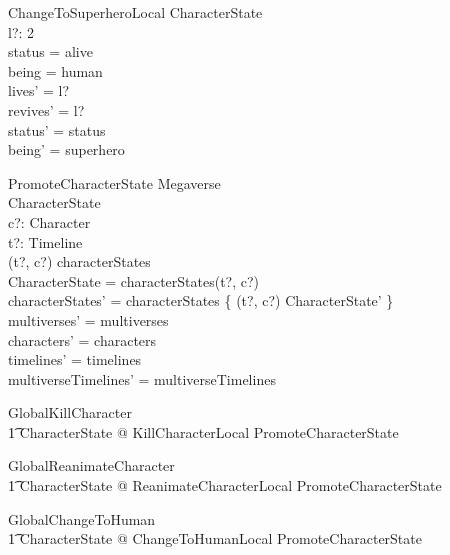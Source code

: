 \documentclass{article}
\begin{document}
\begin{schema}{ChangeToSuperheroLocal}
\Delta CharacterState \\
l?: 2  \\
\where
status = alive \\
being = human \\
lives' = l? \\
revives' = l? \\
status' = status \\
being' = superhero \\
\end{schema}

\begin{schema}{PromoteCharacterState}
\Delta Megaverse \\
\Delta CharacterState \\
c?: Character \\
t?: Timeline \\ 
\where 
(t?, c?) \in \dom characterStates \\ 
\theta CharacterState = characterStates(t?, c?) \\
characterStates' = characterStates \oplus \{ (t?, c?) \mapsto \theta CharacterState' \}   \\
multiverses' = multiverses \\
characters' = characters \\
timelines' = timelines \\
multiverseTimelines' = multiverseTimelines \\
\end{schema}

\begin{zed}
GlobalKillCharacter  \\
\t1 \exists \Delta CharacterState @ KillCharacterLocal \land PromoteCharacterState \\ 
\end{zed}

\begin{zed}
GlobalReanimateCharacter  \\
\t1 \exists \Delta CharacterState @ ReanimateCharacterLocal \land PromoteCharacterState \\
\end{zed}

\begin{zed}
GlobalChangeToHuman  \\ 
\t1 \exists \Delta CharacterState @ ChangeToHumanLocal \land PromoteCharacterState \\
\end{zed}
\end{document}
